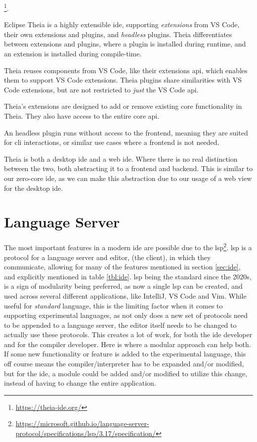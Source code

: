 \footnote{\url{https://theia-ide.org/}}.

Eclipse Theia is a highly extensible \gls*{ide}, supporting \textit{extensions}
from VS Code, their own extensions and plugins, and \textit{headless} plugins.
Theia differentiates between extensions and plugins, where a plugin is installed
during runtime, and an extension is installed during compile-time.

Theia reuses components from VS Code, like their extensions \gls*{api}, which
enables them to support VS Code extensions. Theia plugins share similarities
with VS Code extensions, but are not restricted to \textit{just} the VS Code
\gls*{api}.

Theia's extensions are designed to add or remove existing core functionality in
Theia. They also have access to the entire core \gls*{api}.

An headless plugin runs without access to the frontend, meaning they are suited
for \gls*{cli} interactions, or similar use cases where a frontend is not
needed.

Theia is both a desktop \gls*{ide} and a web \gls*{ide}. Where there is no real
distinction between the two, both abstracting it to a frontend and backend. This
is similar to our zero-core \gls*{ide}, as we can make this abstraction due to
our usage of a web view for the desktop \gls*{ide}.


\section{Language Server} \label{sec:lsp}

The most important features in a modern \gls*{ide} are possible due to the
\gls*{lsp}\footnote{\url{https://microsoft.github.io/language-server-protocol/specifications/lsp/3.17/specification/}}.
\gls*{lsp} is a protocol for a language server and editor, (the client), in
which they communicate, allowing for many of the features mentioned in section
\ref{sec:ide}, and explicitly mentioned in table \ref{tbl:ide}. \gls*{lsp} being
the standard since the 2020s, is a sign of modularity being preferred, as now a
single \gls*{lsp} can be created, and used across several different
applications, like IntelliJ, VS Code and Vim. While useful for
\textit{standard} language, this is the limiting factor when it comes to
supporting experimental languages, as not only does a new set of protocols need
to be appended to a language server, the editor itself needs to be changed to
actually use these protocols. This creates a lot of work, for both the
\gls*{ide} developer and for the compiler developer. Here is where a modular
approach can help both. If some new functionality or feature is added to the
experimental language, this off course means the compiler/interpreter has to be
expanded and/or modified, but for the \gls*{ide}, a module could be added and/or
modified to utilize this change, instead of having to change the entire
application.


